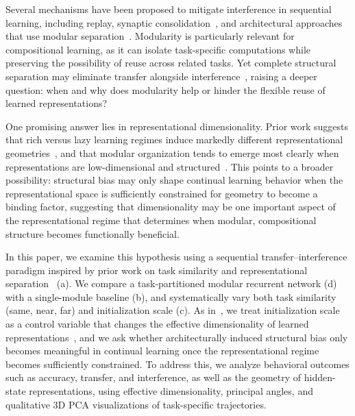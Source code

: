 \documentclass{article}
\theoremstyle{plain}
\theoremstyle{definition}
\theoremstyle{remark}
\begin{document}
Several mechanisms have been proposed to mitigate interference in sequential 
learning, including replay, synaptic consolidation~\cite{kirkpatrick2017overcoming, 
rolnick2019experience}, and architectural approaches that use modular 
separation~\cite{ellefsen2015neural, salatiello2026modularitybedrocknaturalartificial}. 
Modularity is particularly relevant for compositional learning, as it can isolate 
task-specific computations while preserving the possibility of reuse across related 
tasks. Yet complete structural separation may eliminate transfer alongside 
interference~\cite{holton2025humans}, raising a deeper question: when and why does 
modularity help or hinder the flexible reuse of learned representations?

One promising answer lies in representational dimensionality. Prior work suggests 
that rich versus lazy learning regimes induce markedly different representational 
geometries~\cite{flesch2021rich, yu2025dimensionality}, and that modular organization 
tends to emerge most clearly when representations are low-dimensional and 
structured~\cite{Johnston2024.09.30.615925, johnston2024modular}. This points to a 
broader possibility: structural bias may only shape continual learning behavior when 
the representational space is sufficiently constrained for geometry to become a 
binding factor, %
suggesting that dimensionality may be one important aspect of the representational regime 
that determines when modular, compositional structure becomes functionally beneficial.

In this paper, we examine this hypothesis using a sequential transfer--interference
paradigm inspired by prior work on task similarity and representational
separation~\cite{holton2025humans} (a). We compare a
task-partitioned modular recurrent network (d) with a
single-module baseline (b), and systematically vary both task
similarity (same, near, far) and initialization scale (c).
As in~\cite{holton2025humans}, we treat initialization scale as a control variable that
changes the effective dimensionality of learned representations~\cite{flesch2021rich}, and
we ask whether architecturally induced structural bias only becomes meaningful in continual
learning once the representational regime becomes sufficiently constrained. To address
this, we analyze behavioral outcomes such as accuracy, transfer, and interference, as well
as the geometry of hidden-state representations, using effective dimensionality, principal
angles, and qualitative 3D PCA visualizations of task-specific trajectories.
\end{document}
